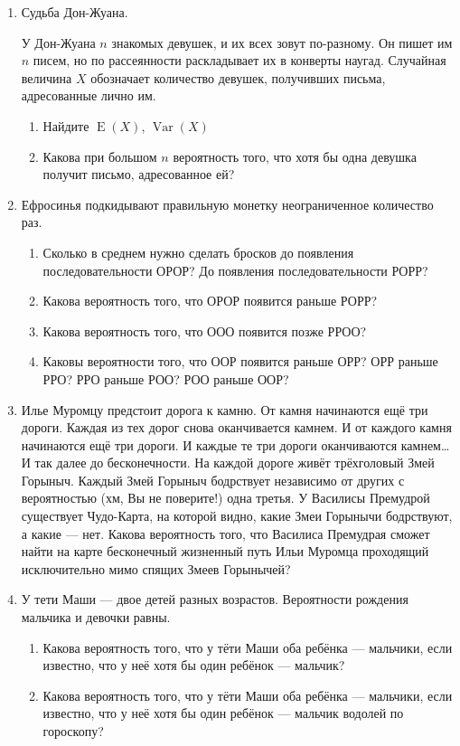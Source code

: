 \documentclass[nobib]{tufte-handout}
\DeclareMathOperator{\Var}{Var}
\DeclareMathOperator{\E}{E}
\begin{document}
\begin{enumerate}
\item Судьба Дон-Жуана. 

У Дон-Жуана $n$  знакомых девушек, и их всех зовут по-разному. Он пишет
им $n$  писем, но по рассеянности раскладывает их в конверты
наугад. Случайная величина $X$ обозначает количество девушек, получивших письма, адресованные лично им.

\begin{enumerate}
\item Найдите $\E(X)$, $\Var(X)$
\item Какова при большом $n$ вероятность того, что хотя бы одна девушка получит письмо, адресованное ей?
\end{enumerate}



\item Ефросинья подкидывают правильную монетку неограниченное количество раз. 

\begin{enumerate}
\item Сколько в среднем нужно сделать бросков до появления последовательности ОРОР? До появления последовательности РОРР?
\item Какова вероятность того, что ОРОР появится раньше РОРР?
\item Какова вероятность того, что ООО появится позже РРОО?
\item Каковы вероятности того, что ООР появится раньше ОРР? ОРР раньше РРО? РРО раньше РОО? РОО раньше ООР?
\end{enumerate}

\item Илье Муромцу предстоит дорога к камню. От камня начинаются ещё три дороги. Каждая из тех дорог снова оканчивается камнем. И от каждого камня начинаются ещё три дороги. И каждые те три дороги оканчиваются камнем\ldots И так далее до бесконечности. На каждой дороге живёт трёхголовый Змей Горыныч. Каждый Змей Горыныч бодрствует независимо от других с вероятностью (хм, Вы не поверите!) одна третья. У Василисы Премудрой существует Чудо-Карта, на которой видно, какие Змеи Горынычи бодрствуют, а какие --- нет. Какова вероятность того, что Василиса Премудрая сможет найти на карте  бесконечный жизненный путь Ильи Муромца проходящий исключительно мимо спящих Змеев Горынычей?

\item У тети Маши --- двое детей разных возрастов. Вероятности рождения мальчика и девочки равны. 

\begin{enumerate}
\item Какова вероятность того, что у тёти Маши оба ребёнка --- мальчики, если известно, что у неё хотя бы один ребёнок --- мальчик?
\item Какова вероятность того, что у тёти Маши оба ребёнка --- мальчики, если известно, что у неё хотя бы один ребёнок --- мальчик водолей по гороскопу?
\end{enumerate}


\end{enumerate}
\end{document}
